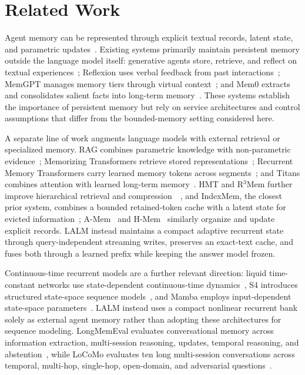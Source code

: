 \documentclass[conference]{IEEEtran}
\begin{document}
\section{Related Work}
Agent memory can be represented through explicit textual records, latent state, and parametric updates~\cite{zhang2024memory}. Existing systems primarily maintain persistent memory outside the language model itself: generative agents store, retrieve, and reflect on textual experiences~\cite{park2023generative}; Reflexion uses verbal feedback from past interactions~\cite{shinn2023reflexion}; MemGPT manages memory tiers through virtual context~\cite{packer2023memgpt}; and Mem0 extracts and consolidates salient facts into long-term memory~\cite{chhikara2025mem0}. These systems establish the importance of persistent memory but rely on service architectures and control assumptions that differ from the bounded-memory setting considered here.

A separate line of work augments language models with external retrieval or specialized memory. RAG combines parametric knowledge with non-parametric evidence~\cite{lewis2020rag}; Memorizing Transformers retrieve stored representations~\cite{wu2022memorizing}; Recurrent Memory Transformers carry learned memory tokens across segments~\cite{bulatov2022rmt}; and Titans combines attention with learned long-term memory~\cite{behrouz2025titans}. HMT and R$^3$Mem further improve hierarchical retrieval and compression~\cite{he2025hmt}~\cite{wang2025r3mem}, and IndexMem, the closest prior system, combines a bounded retained-token cache with a latent state for evicted information~\cite{yang2026indexmem}; A-Mem~\cite{xu2025amem} and H-Mem~\cite{ye2026hmem} similarly organize and update explicit records. LALM instead maintains a compact adaptive recurrent state through query-independent streaming writes, preserves an exact-text cache, and fuses both through a learned prefix while keeping the answer model frozen.

Continuous-time recurrent models are a further relevant direction: liquid time-constant networks use state-dependent continuous-time dynamics~\cite{hasani2021ltc}, S4 introduces structured state-space sequence models~\cite{gu2022s4}, and Mamba employs input-dependent state-space parameters~\cite{gu2024mamba}. LALM instead uses a compact nonlinear recurrent bank solely as external agent memory rather than adopting these architectures for sequence modeling. LongMemEval evaluates conversational memory across information extraction, multi-session reasoning, updates, temporal reasoning, and abstention~\cite{wu2024longmemeval}, while LoCoMo evaluates ten long multi-session conversations across temporal, multi-hop, single-hop, open-domain, and adversarial questions~\cite{maharana2024locomo}.
\end{document}
